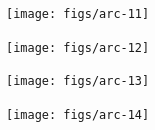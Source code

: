 \documentclass[landscape]{slides}
\begin{document}
\begin{slide}\begin{center}\texttt{[image: figs/arc-11]}\end{center}\vfill\end{slide}
\begin{slide}\begin{center}\texttt{[image: figs/arc-12]}\end{center}\vfill\end{slide}
\begin{slide}\begin{center}\texttt{[image: figs/arc-13]}\end{center}\vfill\end{slide}
\begin{slide}\begin{center}\texttt{[image: figs/arc-14]}\end{center}\vfill\end{slide}
\end{document}
